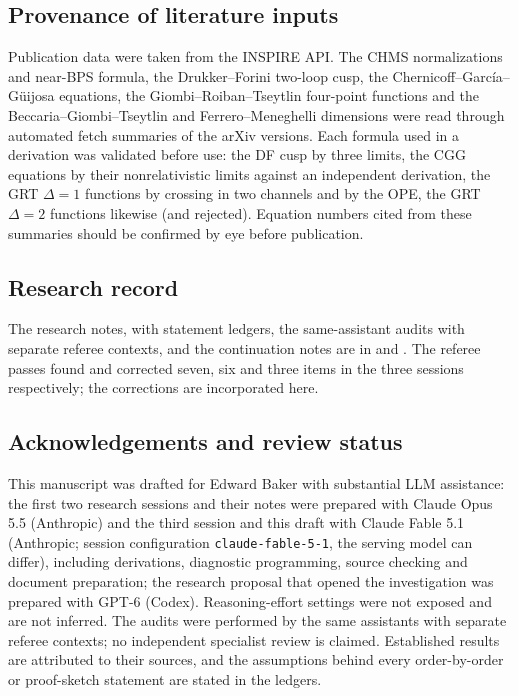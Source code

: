 \subsection{Provenance of literature inputs}

Publication data were taken from the INSPIRE API. The CHMS normalizations and near-BPS formula, the Drukker--Forini
two-loop cusp, the Chernicoff--García--Güijosa equations, the Giombi--Roiban--Tseytlin four-point functions and the
Beccaria--Giombi--Tseytlin and Ferrero--Meneghelli dimensions were read through automated fetch summaries of the
arXiv versions. Each formula used in a derivation was validated before use: the DF cusp by three limits, the CGG
equations by their nonrelativistic limits against an independent derivation, the GRT $\Delta=1$ functions by crossing
in two channels and by the OPE, the GRT $\Delta=2$ functions likewise (and rejected). Equation numbers cited from these
summaries should be confirmed by eye before publication.

\subsection{Research record}

The research notes, with statement ledgers, the same-assistant audits with separate referee contexts, and the
continuation notes are in  and . The referee passes found and corrected
seven, six and three items in the three sessions respectively; the corrections are incorporated here.

\subsection{Acknowledgements and review status}

This manuscript was drafted for Edward Baker with substantial LLM assistance: the first two research sessions and
their notes were prepared with Claude Opus 5.5 (Anthropic) and the third session and this draft with Claude Fable 5.1
(Anthropic; session configuration \texttt{claude-fable-5-1}, the serving model can differ), including derivations,
diagnostic programming, source checking and document preparation; the research proposal that opened the investigation
was prepared with GPT-6 (Codex). Reasoning-effort settings were not exposed and are not inferred. The audits were
performed by the same assistants with separate referee contexts; no independent specialist review is claimed.
Established results are attributed to their sources, and the assumptions behind every order-by-order or
proof-sketch statement are stated in the ledgers.
